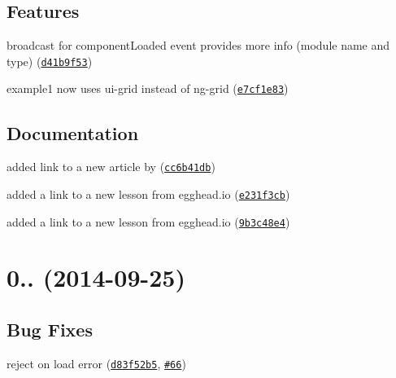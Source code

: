 \subsection*{Features}


\begin{DoxyItemize}
\item broadcast for component\+Loaded event provides more info (module name and type) (\href{https://github.com/ocombe/ocLazyLoad/commit/d41b9f53a46ff8c97b780d4c24f6f64e16017b89}{\tt d41b9f53})
\item example1 now uses ui-\/grid instead of ng-\/grid (\href{https://github.com/ocombe/ocLazyLoad/commit/e7cf1e83ff1453ee5adb8112052d393f9dc09e27}{\tt e7cf1e83})
\end{DoxyItemize}

\subsection*{Documentation}


\begin{DoxyItemize}
\item added link to a new article by  (\href{https://github.com/ocombe/ocLazyLoad/commit/cc6b41db5e0dbcfe68754df325bf9f09e5709bf2}{\tt cc6b41db})
\item added a link to a new lesson from egghead.\+io (\href{https://github.com/ocombe/ocLazyLoad/commit/e231f3cbfd6fb3338479a5f4d8a9ce00d374646e}{\tt e231f3cb})
\item added a link to a new lesson from egghead.\+io (\href{https://github.com/ocombe/ocLazyLoad/commit/9b3c48e49800dd3ed6a01dad7c1d958f8625eddb}{\tt 9b3c48e4})
\end{DoxyItemize}

\label{_0.3.8}%
 \section*{0.. (2014-\/09-\/25)}

\subsection*{Bug Fixes}


\begin{DoxyItemize}
\item reject on load error (\href{https://github.com/ocombe/ocLazyLoad/commit/d83f52b56a77a5cdb230260c497ee2db7283e077}{\tt d83f52b5}, \href{https://github.com/ocombe/ocLazyLoad/issues/66}{\tt \#66})
\end{DoxyItemize}

